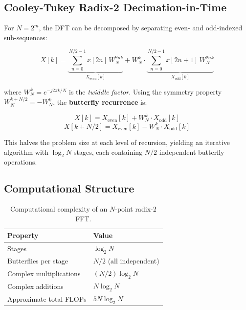 \documentclass[12pt, letterpaper]{article}
\begin{document}
\subsection{Cooley-Tukey Radix-2 Decimation-in-Time}

For $N = 2^m$, the DFT can be decomposed by separating even- and odd-indexed sub-sequences:

\begin{equation}
    X[k] = \underbrace{\sum_{n=0}^{N/2-1} x[2n]\,W_N^{2nk}}_{X_{\text{even}}[k]}
           + W_N^k \cdot \underbrace{\sum_{n=0}^{N/2-1} x[2n+1]\,W_N^{2nk}}_{X_{\text{odd}}[k]}
\end{equation}

where $W_N^k = e^{-j2\pi k/N}$ is the \emph{twiddle factor}. Using the symmetry property
$W_N^{k+N/2} = -W_N^k$, the \textbf{butterfly recurrence} is:

\begin{equation}
    X[k]       = X_{\text{even}}[k] + W_N^k \cdot X_{\text{odd}}[k]
\end{equation}
\begin{equation}
    X[k+N/2]   = X_{\text{even}}[k] - W_N^k \cdot X_{\text{odd}}[k]
\end{equation}

This halves the problem size at each level of recursion, yielding an iterative algorithm with $\log_2 N$ stages, each containing $N/2$ independent butterfly operations.

\subsection{Computational Structure}

\begin{table}[H]
\centering
\caption{Computational complexity of an $N$-point radix-2 FFT.}
\begin{tabular}{@{}ll@{}}
\toprule
\textbf{Property} & \textbf{Value} \\
\midrule
Stages & $\log_2 N$ \\
Butterflies per stage & $N/2$ (all independent) \\
Complex multiplications & $(N/2)\log_2 N$ \\
Complex additions & $N \log_2 N$ \\
Approximate total FLOPs & $5N\log_2 N$ \\
\bottomrule
\end{tabular}
\label{tab:complexity}
\end{table}
\end{document}
